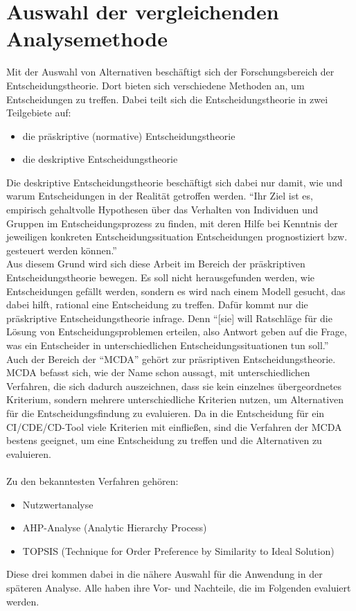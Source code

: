 \section{Auswahl der vergleichenden Analysemethode}
Mit der Auswahl von Alternativen beschäftigt sich der Forschungsbereich der Entscheidungstheorie. Dort bieten sich verschiedene Methoden an, um Entscheidungen zu treffen. Dabei teilt sich die Entscheidungstheorie in zwei Teilgebiete auf\autocite[Vgl.][S.1]{Laux.2014}:
\begin{itemize}
	\item die präskriptive (normative) Entscheidungstheorie
	\item die deskriptive Entscheidungstheorie 
\end{itemize}
Die deskriptive Entscheidungstheorie beschäftigt sich dabei nur damit, wie und warum Entscheidungen in der Realität getroffen werden. \enquote{Ihr Ziel ist es, empirisch gehaltvolle Hypothesen über das Verhalten von Individuen und Gruppen im Entscheidungsprozess zu finden, mit deren Hilfe bei Kenntnis der jeweiligen konkreten Entscheidungssituation Entscheidungen prognostiziert bzw. gesteuert werden können.}\autocite[S.4]{Laux.2014}\\
Aus diesem Grund wird sich diese Arbeit im Bereich der präskriptiven Entscheidungstheorie bewegen. Es soll nicht herausgefunden werden, wie Entscheidungen gefällt werden, sondern es wird nach einem Modell gesucht, das dabei hilft, rational eine Entscheidung zu treffen. Dafür kommt nur die präskriptive Entscheidungstheorie infrage. Denn \enquote{[sie] will Ratschläge für die Lösung von Entscheidungsproblemen erteilen, also Antwort geben auf die Frage, was ein Entscheider in unterschiedlichen Entscheidungssituationen tun soll.}\autocite[S.4]{Laux.2014} \\
Auch der Bereich der \enquote{\ac{MCDA}} gehört zur präsriptiven Entscheidungstheorie. \ac{MCDA} befasst sich, wie der Name schon aussagt, mit unterschiedlichen Verfahren, die sich dadurch auszeichnen, dass sie kein einzelnes übergeordnetes Kriterium, sondern mehrere unterschiedliche Kriterien nutzen, um Alternativen für die Entscheidungsfindung zu evaluieren. Da in die Entscheidung für ein \ac{CI}/\ac{CDE}/\ac{CD}-Tool viele Kriterien mit einfließen, sind die Verfahren der \ac{MCDA} bestens geeignet, um eine Entscheidung zu treffen und die Alternativen zu evaluieren.\\ \\ Zu den bekanntesten Verfahren gehören:
\begin{itemize}
	\item Nutzwertanalyse
	\item AHP-Analyse (Analytic Hierarchy Process)
	\item TOPSIS (Technique for Order Preference by Similarity to Ideal Solution)
\end{itemize}
Diese drei kommen dabei in die nähere Auswahl für die Anwendung in der späteren Analyse. Alle haben ihre Vor- und Nachteile, die im Folgenden evaluiert werden.
